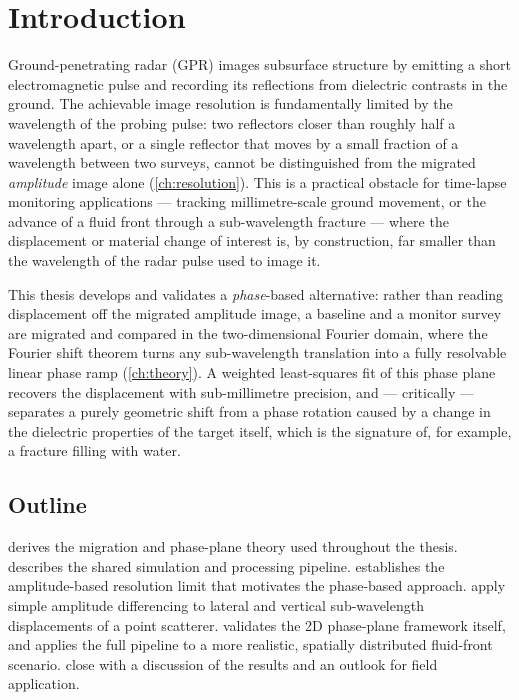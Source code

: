 \chapter{Introduction}
\label{ch:introduction}


Ground-penetrating radar (GPR) images subsurface structure by emitting a
short electromagnetic pulse and recording its reflections from dielectric
contrasts in the ground. The achievable image resolution is fundamentally
limited by the wavelength of the probing pulse: two reflectors closer than
roughly half a wavelength apart, or a single reflector that moves by a small
fraction of a wavelength between two surveys, cannot be distinguished from
the migrated \emph{amplitude} image alone (\cref{ch:resolution}). This is a
practical obstacle for time-lapse monitoring applications --- tracking
millimetre-scale ground movement, or the advance of a fluid front through a
sub-wavelength fracture --- where the displacement or material change of
interest is, by construction, far smaller than the wavelength of the radar
pulse used to image it.

This thesis develops and validates a \emph{phase}-based alternative: rather
than reading displacement off the migrated amplitude image, a baseline and a
monitor survey are migrated and compared in the two-dimensional Fourier
domain, where the Fourier shift theorem turns any sub-wavelength translation
into a fully resolvable linear phase ramp (\cref{ch:theory}). A weighted
least-squares fit of this phase plane recovers the displacement with
sub-millimetre precision, and --- critically --- separates a purely
geometric shift from a phase rotation caused by a change in the dielectric
properties of the target itself, which is the signature of, for example, a
fracture filling with water.

\section*{Outline}

 derives the migration and phase-plane theory used
throughout the thesis.  describes the shared simulation
and processing pipeline.  establishes the amplitude-based
resolution limit that motivates the phase-based approach.
 apply simple amplitude differencing to
lateral and vertical sub-wavelength displacements of a point scatterer.
 validates the 2D phase-plane framework itself, and
 applies the full pipeline to a more realistic, spatially
distributed fluid-front scenario.  close
with a discussion of the results and an outlook for field application.
